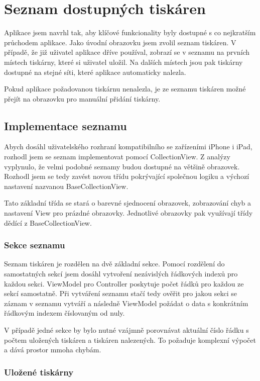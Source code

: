 \section{Seznam dostupných tiskáren}

Aplikace jsem navrhl tak, aby klíčové funkcionality byly dostupné s co nejkratším průchodem aplikace.
Jako úvodní obrazovku jsem zvolil seznam tiskáren.
V případě, že již uživatel aplikace dříve používal, zobrazí se v seznamu na prvních místech tiskárny, které si uživatel uložil.
Na dalších místech jsou pak tiskárny dostupné na stejné síti, které aplikace automaticky nalezla.

Pokud aplikace požadovanou tiskárnu nenalezla, je ze seznamu tiskáren možné přejít na obrazovku pro manuální přidání tiskárny.

\subsection{Implementace seznamu}

Abych dosáhl uživatelského rozhraní kompatibilního se zařízeními iPhone i iPad, rozhodl jsem se seznam implementovat pomocí CollectionView.
Z analýzy vyplynulo, že velmi podobné seznamy budou dostupné na většině obrazovek.
Rozhodl jsem se tedy zavést novou třídu pokrývající společnou logiku a výchozí nastavení nazvanou BaseCollectionView.

Tato základní třída se stará o barevné sjednocení obrazovek, zobrazování chyb a nastavení View pro prázdné obrazovky.
Jednotlivé obrazovky pak využívají třídy dědící z BaseCollectionView.

\subsubsection*{Sekce seznamu}

Seznam tiskáren je rozdělen na dvě základní sekce.
Pomocí rozdělení do samostatných sekcí jsem dosáhl vytvoření nezávislých řádkových indexů pro každou sekci.
ViewModel pro Controller poskytuje počet řádků pro každou ze sekcí samostatně.
Při vytváření seznamu stačí tedy ověřit pro jakou sekci se záznam v seznamu vytváří a následně ViewModel požádat o data s konkrátním řádkovým indexem číslovaným od nuly.

V případě jedné sekce by bylo nutné vzájmně porovnávat aktuální číslo řádku s počtem uložených tiskáren a tiskáren nalezených.
To požaduje komplexní výpočet a dává prostor mmoha chybám.

\subsubsection*{Uložené tiskárny}

